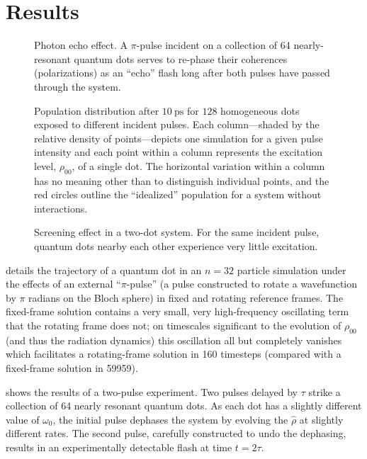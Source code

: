 \documentclass[conference]{IEEEtran}
\begin{document}
\section{Results}

\begin{figure}
  \centering
  
  \caption{\label{fig:echo} Photon echo effect.
    A $\pi$-pulse incident on a collection of 64 nearly-resonant quantum dots serves to re-phase their coherences (polarizations) as an ``echo'' flash long after both pulses have passed through the system.
  }
\end{figure}

\begin{figure}
  \centering
  
  \caption{\label{fig:decoherence}
    Population distribution after $\SI{10}{\pico\second}$ for $128$ homogeneous dots exposed to different incident pulses. 
    Each column---shaded by the relative density of points---depicts one simulation for a given pulse intensity and each point within a column represents the excitation level, $\rho_{00}$, of a single dot.
    The horizontal variation within a column has no meaning other than to distinguish individual points, and the red circles outline the ``idealized'' population for a system without interactions.
  }
\end{figure}

\begin{figure}
  \centering
  
  \caption{\label{fig:screening} Screening effect in a two-dot system.
    For the same incident pulse, quantum dots nearby each other experience very little excitation.
  }
\end{figure}

 details the trajectory of a quantum dot in an $n=32$ particle simulation under the effects of an external ``$\pi$-pulse'' (a pulse constructed to rotate a wavefunction by $\pi$ radians on the Bloch sphere) in fixed and rotating reference frames.
The fixed-frame solution contains a very small, very high-frequency oscillating term that the rotating frame does not; on timescales significant to the evolution of $\rho_{00}$ (and thus the radiation dynamics) this oscillation all but completely vanishes which facilitates a rotating-frame solution in 160 timesteps (compared with a fixed-frame solution in 59959).

 shows the results of a two-pulse experiment.
Two pulses delayed by $\tau$ strike a collection of 64 nearly resonant quantum dots.
As each dot has a slightly different value of $\omega_0$, the initial pulse dephases the system by evolving the $\hat{\rho}$ at slightly different rates.
The second pulse, carefully constructed to undo the dephasing, results in an experimentally detectable flash at time $t = 2\tau$.
\end{document}
